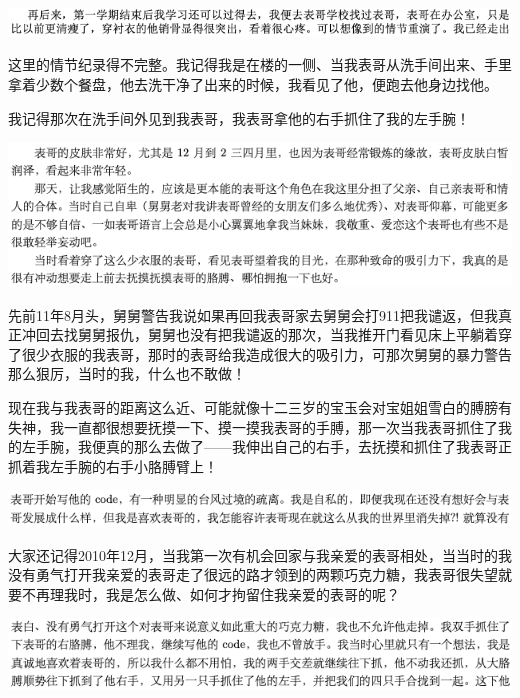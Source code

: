 \documentclass[9pt, b5paper]{article}
\begin{document}
\begin{center}
\includegraphics[width=.9\linewidth]{./pic/backups_plans_20210505_204248.png}
\end{center}

这里的情节纪录得不完整。我记得我是在楼的一侧、当我表哥从洗手间出来、手里拿着少数个餐盘，他去洗干净了出来的时候，我看见了他，便跑去他身边找他。

我记得那次在洗手间外见到我表哥，我表哥拿他的右手抓住了我的左手腕！

\begin{center}
\includegraphics[width=.9\linewidth]{./pic/backups_plans_20210506_100437.png}
\end{center}

先前11年8月头，舅舅警告我说如果再回我表哥家去舅舅会打911把我谴返，但我真正冲回去找舅舅报仇，舅舅也没有把我谴返的那次，当我推开门看见床上平躺着穿了很少衣服的我表哥，那时的表哥给我造成很大的吸引力，可那次舅舅的暴力警告那么狠厉，当时的我，什么也不敢做！

现在我与我表哥的距离这么近、可能就像十二三岁的宝玉会对宝姐姐雪白的膊膀有失神，我一直都很想要抚摸一下、摸一摸我表哥的手膊，那一次当我表哥抓住了我的左手腕，我便真的那么去做了——我伸出自己的右手，去抚摸和抓住了我表哥正抓着我左手腕的右手小胳膊臂上！

\begin{center}
\includegraphics[width=.9\linewidth]{./pic/backups_plans_20210506_110001.png}
\end{center}

大家还记得2010年12月，当我第一次有机会回家与我亲爱的表哥相处，当当时的我没有勇气打开我亲爱的表哥走了很远的路才领到的两颗巧克力糖，我表哥很失望就要不再理我时，我是怎么做、如何才拘留住我亲爱的表哥的呢？

\begin{center}
\includegraphics[width=.9\linewidth]{./pic/backups_plans_20210506_110019.png}
\end{center}
\end{document}
